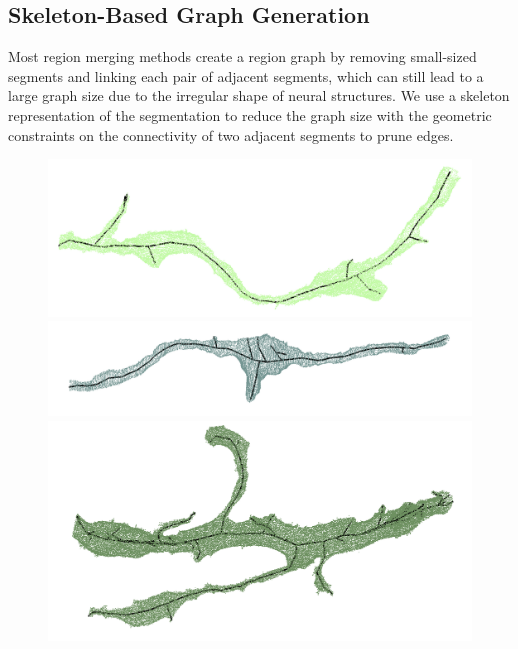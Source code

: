 \subsection{Skeleton-Based Graph Generation}
\label{sec:skeletonization}
Most region merging methods create a region graph by removing small-sized segments and linking each pair of adjacent segments, which can still lead to a large graph size due to the irregular shape of neural structures.
We use a skeleton representation of the segmentation to reduce the graph size with the geometric constraints on the connectivity of two adjacent segments to prune edges.

\begin{figure}[t]
	\centering
	\begin{minipage}{0.45\linewidth}
		\includegraphics[width=\linewidth]{./figures/skeleton1.png}		
	\end{minipage}
	\hfill
	\begin{minipage}{0.45\linewidth}
		\includegraphics[width=\linewidth]{./figures/skeleton2.png}		
	\end{minipage}
	\begin{minipage}{0.45\linewidth}
		\includegraphics[width=\linewidth]{./figures/skeleton3.png}		

\end{minipage}
\end{figure}
